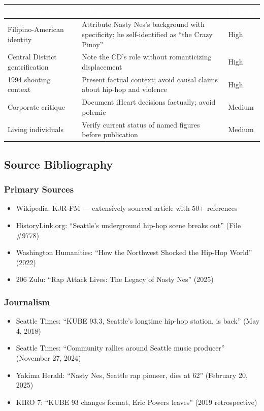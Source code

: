 \documentclass[11pt,letterpaper]{article}
\newcommand{\tableheader}[1]{\textbf{\sffamily\textcolor{white}{#1}}}
\begin{document}
\begin{center}
\begin{tabularx}{\textwidth}{L{3.5cm}XC{2cm}}
\toprule
{}
\tableheader{Consideration} & \tableheader{Mitigation} & \tableheader{Priority} \\
\midrule
Filipino-American identity & Attribute Nasty Nes's background with specificity; he self-identified as ``the Crazy Pinoy'' & High \\
Central District gentrification & Note the CD's role without romanticizing displacement & High \\
1994 shooting context & Present factual context; avoid causal claims about hip-hop and violence & High \\
Corporate critique & Document iHeart decisions factually; avoid polemic & Medium \\
Living individuals & Verify current status of named figures before publication & Medium \\
\bottomrule
\end{tabularx}
\end{center}

\subsection{Source Bibliography}

\subsubsection{Primary Sources}
\begin{itemize}[leftmargin=2em]
\item Wikipedia: KJR-FM --- extensively sourced article with 50+ references
\item HistoryLink.org: ``Seattle's underground hip-hop scene breaks out'' (File \#9778)
\item Washington Humanities: ``How the Northwest Shocked the Hip-Hop World'' (2022)
\item 206 Zulu: ``Rap Attack Lives: The Legacy of Nasty Nes'' (2025)
\end{itemize}

\subsubsection{Journalism}
\begin{itemize}[leftmargin=2em]
\item Seattle Times: ``KUBE 93.3, Seattle's longtime hip-hop station, is back'' (May 4, 2018)
\item Seattle Times: ``Community rallies around Seattle music producer'' (November 27, 2024)
\item Yakima Herald: ``Nasty Nes, Seattle rap pioneer, dies at 62'' (February 20, 2025)
\item KIRO 7: ``KUBE 93 changes format, Eric Powers leaves'' (2019 retrospective)
\end{itemize}
\end{document}
